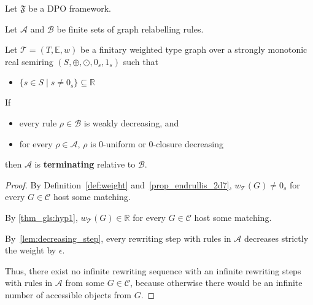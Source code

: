 \begin{theorem} 
  \label{thm:termination_gls}
  Let $\mathfrak{F}$ be a DPO framework.
  
  Let $\mathcal{A}$ and $\mathcal{B}$ be finite sets of graph relabelling rules.
  
  Let $\mathcal{T} = (T,\mathbb{E}, w)$ be a finitary weighted type graph over a strongly monotonic real semiring \( (S, \oplus, \odot, 0_s, 1_s)\) such that 
  \begin{itemize}
       \item\label{thm_gls:hyp1} $\{s \in S\mid s \neq 0_s\} \subseteq \mathbb{R}$
  \end{itemize}

  If  
  \begin{itemize}
  \item every rule $\rho \in \mathcal{B}$ is weakly decreasing, and
  \item for every $\rho \in \mathcal{A}$, $\rho$ is $0$-uniform or $0$-closure decreasing 
  \end{itemize}
  then $\mathcal{A }$ is \textbf{terminating} relative to $\mathcal{B }$.
\end{theorem}

\begin{proof}
  By Definition~\ref{def:weight} and~\autoref{prop_endrullis_2d7}, $w_\mathcal{T}(G) \neq 0_s$ for every $G \in \mathcal{C}$ host some matching.

  By \ref{thm_gls:hyp1}, $w_\mathcal{T}(G) \in \mathbb{R}$ for every $G \in \mathcal{C}$ host some matching.

  By~\autoref{lem:decreasing_step}, every rewriting step with rules in $\mathcal{A}$ decreases strictly the weight by $\epsilon$.

  Thus, there exist no infinite rewriting sequence with an infinite rewriting steps with rules in $\mathcal{A}$ from some $G \in \mathcal{C}$, because otherwise there would be an infinite number of accessible objects from $G$.
\end{proof}
